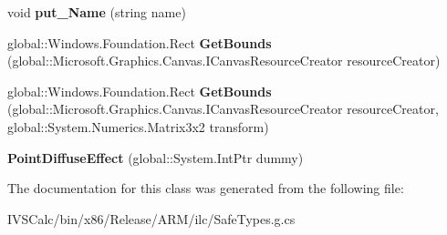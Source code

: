 \begin{DoxyCompactItemize}
\mbox{\label{class_microsoft_1_1_graphics_1_1_canvas_1_1_effects_1_1_point_diffuse_effect_a7859ce70aa004a985213e13d24077993}} 
void {\bfseries put\+\_\+\+Name} (string name)
\item 
\mbox{\label{class_microsoft_1_1_graphics_1_1_canvas_1_1_effects_1_1_point_diffuse_effect_a4ea41fe2e96af16d284ce3c8fed52889}} 
global\+::\+Windows.\+Foundation.\+Rect {\bfseries Get\+Bounds} (global\+::\+Microsoft.\+Graphics.\+Canvas.\+I\+Canvas\+Resource\+Creator resource\+Creator)
\item 
\mbox{\label{class_microsoft_1_1_graphics_1_1_canvas_1_1_effects_1_1_point_diffuse_effect_a7e675ad720b1c7fd2661be4a4e964855}} 
global\+::\+Windows.\+Foundation.\+Rect {\bfseries Get\+Bounds} (global\+::\+Microsoft.\+Graphics.\+Canvas.\+I\+Canvas\+Resource\+Creator resource\+Creator, global\+::\+System.\+Numerics.\+Matrix3x2 transform)
\item 
\mbox{\label{class_microsoft_1_1_graphics_1_1_canvas_1_1_effects_1_1_point_diffuse_effect_a339b570af9f36502e7a354c01bdefc1a}} 
{\bfseries Point\+Diffuse\+Effect} (global\+::\+System.\+Int\+Ptr dummy)
\end{DoxyCompactItemize}


The documentation for this class was generated from the following file\+:\begin{DoxyCompactItemize}
\item 
I\+V\+S\+Calc/bin/x86/\+Release/\+A\+R\+M/ilc/Safe\+Types.\+g.\+cs\end{DoxyCompactItemize}

